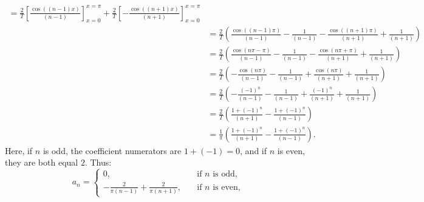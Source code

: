 \documentclass[11pt]{article}
\begin{document}
\begin{solution}
\begin{align*}
            =
            \frac{2}{T}
            \left[\frac{ \cos((n-1)x) }{ (n-1) } \right]_{x=0}^{x=\pi}
            +
            \frac{2}{T}
            \left[- \frac{ \cos((n+1)x) }{ (n+1) } \right]_{x=0}^{x=\pi}
            \\&
            = 
            \frac 2 T 
            \left( 
                \frac{ \cos((n-1)\pi) }{(n-1)} 
                - 
                \frac{1}{(n-1)}
                -
                \frac{ \cos((n+1)\pi) }{(n+1)} 
                + 
                \frac{1}{(n+1)}
            \right)
            \\&
            = 
            \frac 2 T 
            \left( 
                \frac{ \cos( n \pi - \pi ) }{(n-1)} 
                - 
                \frac{1}{(n-1)}
                -
                \frac{ \cos( n \pi + \pi ) }{(n+1)} 
                + 
                \frac{1}{(n+1)}
            \right)
            \\&
            = 
            \frac 2 T 
            \left( 
                -
                \frac{ \cos(n\pi) }{(n-1)} 
                - 
                \frac{1}{(n-1)}
                +
                \frac{ \cos(n\pi) }{(n+1)} 
                + 
                \frac{1}{(n+1)}
            \right)
            \\&
            = 
            \frac 2 T 
            \left( 
                -
                \frac{ (-1)^n }{(n-1)} 
                - 
                \frac{1}{(n-1)}
                +
                \frac{ (-1)^n }{(n+1)} 
                + 
                \frac{1}{(n+1)}
            \right)
            \\&
            = 
            \frac 2 T 
            \left( 
                \frac{ 1 + (-1)^n }{(n+1)} 
                -
                \frac{ 1 + (-1)^n }{(n-1)} 
            \right)
            \\&
            = 
            \frac 1 \pi 
            \left( 
                \frac{ 1 + (-1)^n }{(n+1)} 
                -
                \frac{ 1 + (-1)^n }{(n-1)} 
            \right)
            .
        \end{align*}	
        Here, if $n$ is odd, the coefficient numerators are $1 + (-1) = 0$, and if $n$ is even, they are both equal $2$. Thus:
        \[
            a_n = 
            \begin{cases}
            0 ,\quad &\text{if } n\text{ is odd,}\\
            -\frac{2}{\pi(n-1)} + \frac{2}{\pi(n+1)}  ,\quad &\text{if } n\text{ is even,}
            \end{cases}
        \]
\end{solution}
\end{document}
